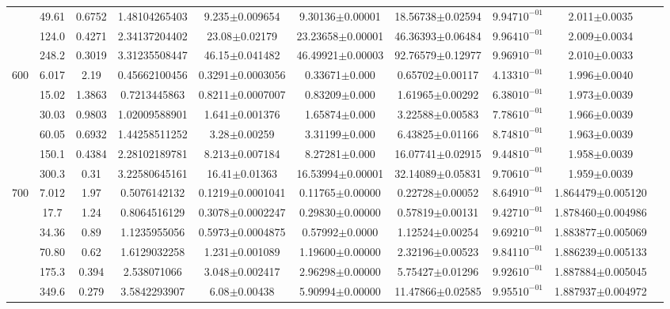 \begin{landscape}
\begin{table}[ht]
\begin{tabular}{| c | c | c | c | c | c | c | c | c | c |}
\cline{2-9}
&49.61 & 0.6752 & 1.48104265403 & 9.235$\pm$0.009654 & 9.30136$\pm$0.00001 & 18.56738$\pm$0.02594 & 9.947$10^{-01}$ & 2.011$\pm$0.0035\\
\cline{2-9}
&124.0 & 0.4271 & 2.34137204402 & 23.08$\pm$0.02179 & 23.23658$\pm$0.00001 & 46.36393$\pm$0.06484 & 9.964$10^{-01}$ & 2.009$\pm$0.0034\\
\cline{2-9}
&248.2 & 0.3019 & 3.31235508447 & 46.15$\pm$0.041482 & 46.49921$\pm$0.00003 & 92.76579$\pm$0.12977 & 9.969$10^{-01}$ & 2.010$\pm$0.0033\\
\hline \hline
\multirow {6}{*}{600}&6.017 & 2.19 & 0.45662100456 & 0.3291$\pm$0.0003056 & 0.33671$\pm$0.000 & 0.65702$\pm$0.00117 & 4.133$10^{-01}$ & 1.996$\pm$0.0040\\
\cline{2-9}
&15.02 & 1.3863 & 0.7213445863 & 0.8211$\pm$0.0007007 & 0.83209$\pm$0.000 & 1.61965$\pm$0.00292 & 6.380$10^{-01}$ & 1.973$\pm$0.0039\\
\cline{2-9}
&30.03 & 0.9803 & 1.02009588901 & 1.641$\pm$0.001376 & 1.65874$\pm$0.000 & 3.22588$\pm$0.00583 & 7.786$10^{-01}$ & 1.966$\pm$0.0039\\
\cline{2-9}
&60.05 & 0.6932 & 1.44258511252 & 3.28$\pm$0.00259 & 3.31199$\pm$0.000 & 6.43825$\pm$0.01166 & 8.748$10^{-01}$ & 1.963$\pm$0.0039\\
\cline{2-9}
&150.1 & 0.4384 & 2.28102189781 & 8.213$\pm$0.007184 & 8.27281$\pm$0.000 & 16.07741$\pm$0.02915 & 9.448$10^{-01}$ & 1.958$\pm$0.0039\\
\cline{2-9}
&300.3 & 0.31 & 3.22580645161 & 16.41$\pm$0.01363 & 16.53994$\pm$0.00001 & 32.14089$\pm$0.05831 & 9.706$10^{-01}$ & 1.959$\pm$0.0039\\
\hline\hline
\multirow {6}{*}{700} & 7.012 & 1.97 & 0.5076142132 & 0.1219$\pm$0.0001041 & 0.11765$\pm$0.00000 & 0.22728$\pm$0.00052 & 8.649$10^{-01}$ & 1.864479$\pm$0.005120\\
\cline{2-9}
& 17.7 & 1.24 &  0.8064516129 & 0.3078$\pm$0.0002247 & 0.29830$\pm$0.00000 & 0.57819$\pm$0.00131 & 9.427$10^{-01}$ & 1.878460$\pm$0.004986\\
\cline{2-9}
& 34.36 & 0.89 & 1.1235955056 & 0.5973$\pm$0.0004875 & 0.57992$\pm$0.0000 & 1.12524$\pm$0.00254 & 9.692$10^{-01}$ & 1.883877$\pm$0.005069\\
\cline{2-9}
& 70.80 & 0.62 & 1.6129032258 & 1.231$\pm$0.001089 & 1.19600$\pm$0.00000 & 2.32196$\pm$0.00523 & 9.841$10^{-01}$ & 1.886239$\pm$0.005133\\
\cline{2-9}
& 175.3 & 0.394 & 2.538071066 & 3.048$\pm$0.002417 & 2.96298$\pm$0.00000 & 5.75427$\pm$0.01296 & 9.926$10^{-01}$ & 1.887884$\pm$0.005045\\
\cline{2-9}
& 349.6 & 0.279 & 3.5842293907 & 6.08$\pm$0.00438 & 5.90994$\pm$0.00000 & 11.47866$\pm$0.02585 & 9.955$10^{-01}$ & 1.887937$\pm$0.004972\\
\hline \hline

\end{tabular}
\label{table:mg_sushi_compare}
\end{table}\end{landscape}
